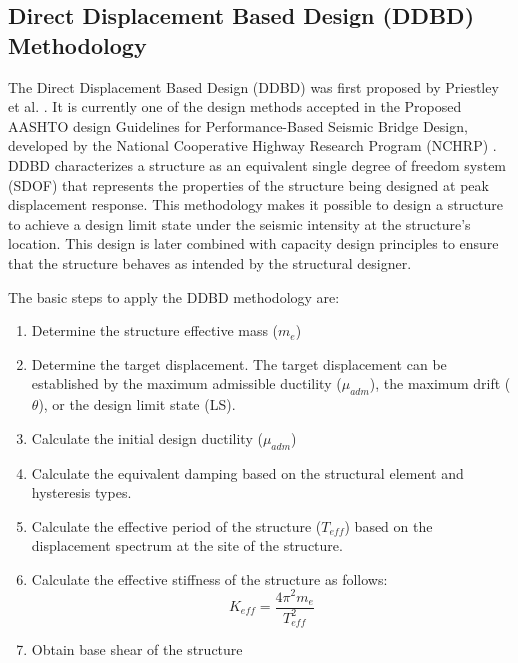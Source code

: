 \subsection{Direct Displacement Based Design (DDBD) Methodology}
The Direct Displacement Based Design (DDBD) was first proposed by Priestley et al. \cite{Priestley2007}. It is currently one of the design methods accepted in the Proposed AASHTO design Guidelines for Performance-Based Seismic Bridge Design, developed by the National Cooperative Highway Research Program (NCHRP) \cite{NCHRP2020}. DDBD characterizes a structure as an equivalent single degree of freedom system (SDOF) that represents the properties of the structure being designed at peak displacement response. This methodology makes it possible to design a structure to achieve a design limit state under the seismic intensity at the structure's location. This design is later combined with capacity design principles to ensure that the structure behaves as intended by the structural designer. 

The basic steps to apply the DDBD methodology are:
\begin{enumerate}
    \item Determine the structure effective mass ($m_{e}$)
    \item Determine the target displacement. The target displacement can be established by the maximum admissible ductility ($\mu_{adm}$), the maximum drift ($\theta$), or the design limit state (LS).
    \item Calculate the initial design ductility ($\mu_{adm}$)
    \item Calculate the equivalent damping based on the structural element and hysteresis types.
    \item Calculate the effective period of the structure ($T_{eff}$) based on the displacement spectrum at the site of the structure.
    \item Calculate the effective stiffness of the structure as follows:
    \begin{equation}
        K_{eff}=\frac{4\pi^2 m_{e}}{T_{eff}^ 2}
    \end{equation}
    \item Obtain base shear of the structure
\end{enumerate}

